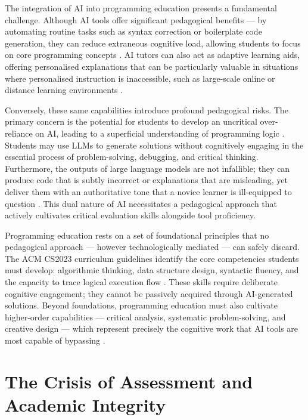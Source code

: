 The integration of AI into programming education presents a fundamental challenge. Although AI tools offer significant pedagogical benefits — by automating routine tasks such as syntax correction or boilerplate code generation, they can reduce extraneous cognitive load, allowing students to focus on core programming concepts \cite{Bettayeb2024}. AI tutors can also act as adaptive learning aids, offering personalised explanations that can be particularly valuable in situations where personalised instruction is inaccessible, such as large-scale online or distance learning environments \cite{OlumideEdwards-Fapohunda2024, Zviel-Girshin2024}.

Conversely, these same capabilities introduce profound pedagogical risks. The primary concern is the potential for students to develop an uncritical over-reliance on AI, leading to a superficial understanding of programming logic \cite{Elsayed2024}. Students may use LLMs to generate solutions without cognitively engaging in the essential process of problem-solving, debugging, and critical thinking. Furthermore, the outputs of large language models are not infallible; they can produce code that is subtly incorrect or explanations that are misleading, yet deliver them with an authoritative tone that a novice learner is ill-equipped to question \cite{Zviel-Girshin2024}. This dual nature of AI necessitates a pedagogical approach that actively cultivates critical evaluation skills alongside tool proficiency.

Programming education rests on a set of foundational principles that no pedagogical approach — however technologically mediated — can safely discard. The ACM CS2023 curriculum guidelines identify the core competencies students must develop: algorithmic thinking, data structure design, syntactic fluency, and the capacity to trace logical execution flow \cite{Raj2023}. These skills require deliberate cognitive engagement; they cannot be passively acquired through AI-generated solutions. Beyond foundations, programming education must also cultivate higher-order capabilities — critical analysis, systematic problem-solving, and creative design — which represent precisely the cognitive work that AI tools are most capable of bypassing \cite{Cambaz2024}.


\section{The Crisis of Assessment and Academic Integrity}

